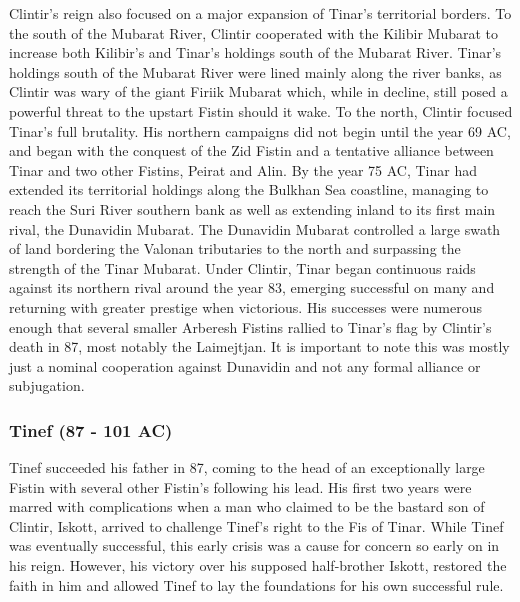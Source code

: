 			Clintir's reign also focused on a major expansion of Tinar's territorial borders. To the south of the Mubarat River, Clintir cooperated with the Kilibir Mubarat to increase both Kilibir's and Tinar's holdings south of the Mubarat River. Tinar's holdings south of the Mubarat River were lined mainly along the river banks, as Clintir was wary of the giant Firiik Mubarat which, while in decline, still posed a powerful threat to the upstart Fistin should it wake. To the north, Clintir focused Tinar's full brutality. His northern campaigns did not begin until the year 69 AC, and began with the conquest of the Zid Fistin and a tentative alliance between Tinar and two other Fistins, Peirat and Alin. By the year 75 AC, Tinar had extended its territorial holdings along the Bulkhan Sea coastline, managing to reach the Suri River southern bank as well as extending inland to its first main rival, the Dunavidin Mubarat. The Dunavidin Mubarat controlled a large swath of land bordering the Valonan tributaries to the north and surpassing the strength of the Tinar Mubarat. Under Clintir, Tinar began continuous raids against its northern rival around the year 83, emerging successful on many and returning with greater prestige when victorious. His successes were numerous enough that several smaller Arberesh Fistins rallied to Tinar's flag by Clintir's death in 87, most notably the Laimejtjan. It is important to note this was mostly just a nominal cooperation against Dunavidin and not any formal alliance or subjugation.
		\subsubsection{Tinef (87 - 101 AC)}
			Tinef succeeded his father in 87, coming to the head of an exceptionally large Fistin with several other Fistin's following his lead. His first two years were marred with complications when a man who claimed to be the bastard son of Clintir, Iskott, arrived to challenge Tinef's right to the Fis of Tinar. While Tinef was eventually successful, this early crisis was a cause for concern so early on in his reign. However, his victory over his supposed half-brother Iskott, restored the faith in him and allowed Tinef to lay the foundations for his own successful rule.
			
